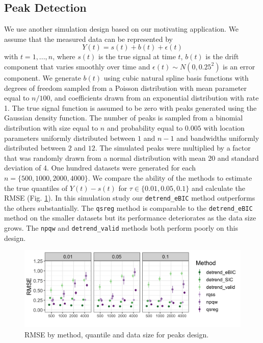 \documentclass[12pt]{article}
\begin{document}
	\subsection{Peak Detection}
	We use another simulation design based on our motivating application. We assume that the measured data can be represented by 
	\begin{equation}
	Y(t) = s(t) + b(t) + \epsilon(t)
	\end{equation} 
	with $t = 1, ..., n$, where $s(t)$ is the true signal at time $t$, $b(t)$ is the drift component that varies smoothly over time and $\epsilon(t) \sim N(0, 0.25^2)$ is an error component. We generate $b(t)$ using cubic natural spline basis functions with degrees of freedom sampled from a Poisson distribution with mean parameter equal to $n/100$,  and coefficients drawn from an exponential distribution with rate 1. The true signal function is assumed to be zero with peaks generated using the Gaussian density function. The number of peaks is sampled from a binomial distribution with size equal to $n$ and probability equal to $0.005$ with location parameters uniformly distributed between $1$ and $n-1$ and bandwidths uniformly distributed between $2$ and $12$. The simulated peaks were multiplied by a factor that was randomly drawn from a normal distribution with mean 20 and standard deviation of 4. One hundred datasets were generated for each $n=\{500, 1000, 2000, 4000\}$. We compare the ability of the methods to estimate the true quantiles of $Y(t)-s(t)$  for $\tau \in \{0.01, 0.05, 0.1\}$ and calculate the RMSE (Fig. \ref{fig:peaks_rmse}). In this simulation study our \texttt{detrend\_eBIC} method outperforms the others substantially. The \texttt{qsreg} method is comparable to the \texttt{detrend\_eBIC} method on the smaller datasets but its performance deteriorates as the data size grows. The \texttt{npqw} and \texttt{detrend\_valid} methods both perform poorly on this design. 
	
	\begin{figure}
		\includegraphics[width = \linewidth]{Figures/peaks_mse.png}	
		\caption{RMSE by method, quantile and data size for peaks design.}
		\label{fig:peaks_rmse}
	\end{figure}
	
\end{document}
